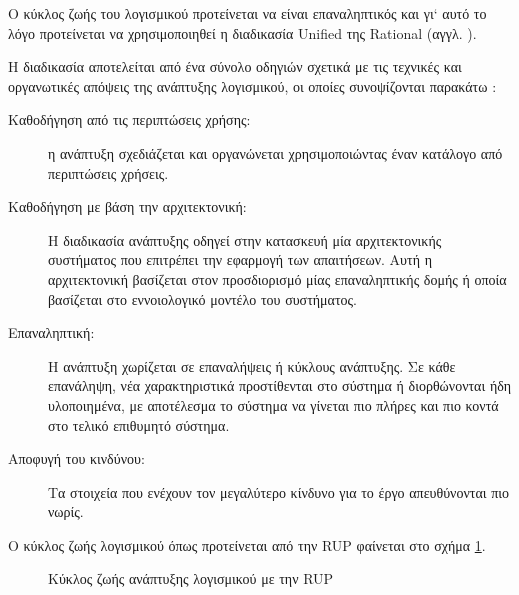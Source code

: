 \documentclass{assignment}
\begin{document}
Ο κύκλος ζωής του λογισμικού προτείνεται να είναι επαναληπτικός \cite{virvou_uml} και γι` αυτό το λόγο προτείνεται να χρησιμοποιηθεί η διαδικασία Unified της Rational (αγγλ. ).

Η διαδικασία  αποτελείται από ένα σύνολο οδηγιών σχετικά με τις τεχνικές και οργανωτικές απόψεις της ανάπτυξης λογισμικού, οι οποίες συνοψίζονται παρακάτω \cite{wazlawick2014object}:

\begin{description}
\item[Καθοδήγηση από τις περιπτώσεις χρήσης:] η ανάπτυξη σχεδιάζεται και οργανώνεται χρησιμοποιώντας έναν κατάλογο από περιπτώσεις χρήσεις. 
\item[Καθοδήγηση με βάση την αρχιτεκτονική:] Η διαδικασία ανάπτυξης οδηγεί στην κατασκευή μία αρχιτεκτονικής συστήματος που επιτρέπει την εφαρμογή των απαιτήσεων. Αυτή η αρχιτεκτονική βασίζεται στον προσδιορισμό μίας επαναληπτικής δομής ή οποία βασίζεται στο εννοιολογικό μοντέλο του συστήματος.
\item[Επαναληπτική: ] Η ανάπτυξη χωρίζεται σε επαναλήψεις ή κύκλους ανάπτυξης. Σε κάθε επανάληψη, νέα χαρακτηριστικά προστίθενται στο σύστημα ή διορθώνονται ήδη υλοποιημένα, με αποτέλεσμα το σύστημα να γίνεται πιο πλήρες και πιο κοντά στο τελικό επιθυμητό σύστημα.
\item[Αποφυγή του κινδύνου: ] Τα στοιχεία που ενέχουν τον μεγαλύτερο κίνδυνο για το έργο απευθύνονται πιο νωρίς.  
\end{description}

Ο κύκλος ζωής λογισμικού όπως προτείνεται από την RUP φαίνεται στο σχήμα \ref{fig:rup_cycle}.

\begin{figure}
\begin{center}
\caption{Κύκλος ζωής ανάπτυξης λογισμικού με την RUP \cite{wazlawick2014object}}
\label{fig:rup_cycle}
\end{center}
\end{figure}
\end{document}
